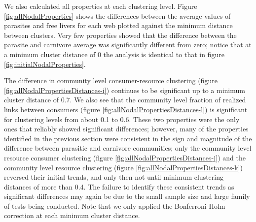 \documentclass[/home/nkappler/Research/Dissertation/dissertation.tex]{subfiles}
\begin{document}
\begin{bibunit}
\begin{figure}
\end{figure}

We also calculated all properties at each clustering level. Figure
\ref{fig:allNodalProperties} shows the differences between the average values
of parasites and free livers for each web plotted against the minimum distance
between clusters. Very few properties showed that the difference between the parasite and
carnivore average was significantly different from zero; notice that at a
minimum cluster distance of 0 the analysis is identical to that in
figure \ref{fig:initialNodalProperties}. 

The difference in community level consumer-resource clustering (figure
\ref{fig:allNodalPropertiesDistances-i}) continues to be significant up to a
minimum cluster distance of 0.7. We also see that the community level fraction
of realized links between consumers (figure
\ref{fig:allNodalPropertiesDistances-l}) is significant for clustering levels
from about 0.1 to 0.6. These two properties were the only ones that reliably
showed significant differences; however, many of the properties identified in
the previous section were consistent in the sign and magnitude of the
difference between parasitic and carnivore communities; only the community
level resource consumer clustering (figure
\ref{fig:allNodalPropertiesDistances-j}) and the community level resource
clustering (figure \ref{fig:allNodalPropertiesDistances-k}) reversed their
initial trends, and only then not until minimum clustering distances of more
than 0.4. The failure to identify these consistent trends as significant
differences may again be due to the small sample size and large family of tests
being conducted. Note that we only applied the Bonferroni-Holm correction at
each minimum cluster distance.



\end{bibunit}
\end{document}
